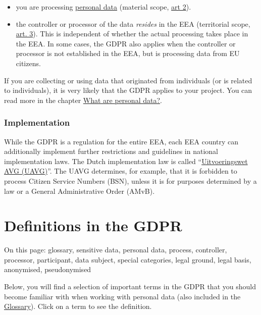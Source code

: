 \documentclass[
]{book}
\providecommand{\tightlist}{%
  \setlength{\itemsep}{0pt}\setlength{\parskip}{0pt}}
\begin{document}
\begin{itemize}
\tightlist
\item
  you are processing \protect\hyperlink{personal-data}{personal data}
  (material scope, \href{https://gdpr-info.eu/art-2-gdpr/}{art 2}).
\item
  the controller or processor of the data \emph{resides} in the EEA (territorial
  scope, \href{https://gdpr-info.eu/art-3-gdpr/}{art. 3}).
  This is independent of whether the actual processing takes place in the EEA.
  In some cases, the GDPR also applies when the controller or processor is not
  established in the EEA, but is processing data from EU citizens.
\end{itemize}

If you are collecting or using data that originated from individuals (or is
related to individuals), it is very likely that the GDPR applies to your project.
You can read more in the chapter \protect\hyperlink{personal-data}{What are personal data?}.

\hypertarget{implementation}{%
\subsubsection{Implementation}\label{implementation}}

While the GDPR is a regulation for the entire EEA, each EEA country can additionally
implement further restrictions and guidelines in national implementation laws. The
Dutch implementation law is called
``\href{https://wetten.overheid.nl/BWBR0040940/2021-07-01\%22}{Uitvoeringswet AVG (UAVG)}''.
The UAVG determines, for example, that it is forbidden to process Citizen
Service Numbers (BSN), unless it is for purposes determined by a law or a
General Administrative Order (AMvB).

\hypertarget{definitions}{%
\section{Definitions in the GDPR}\label{definitions}}

On this page: glossary, sensitive data, personal data, process, controller,
processor, participant, data subject, special categories, legal ground, legal
basis, anonymised, pseudonymised

Below, you will find a selection of important terms in the GDPR that you should
become familiar with when working with personal data (also included in the
\protect\hyperlink{glossary}{Glossary}). Click on a term to see the definition.
\end{document}
